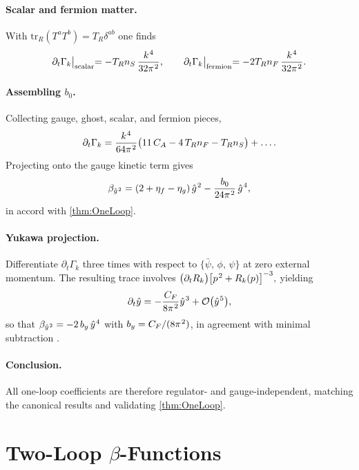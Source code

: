 \documentclass[pdflatex,sn-mathphys-num]{sn-jnl}
\theoremstyle{thmstyleone}
\theoremstyle{thmstyletwo}%
\theoremstyle{thmstylethree}%
\newcommand{\sm}{\hspace{.065em}}
\newcommand{\smexp}[1]{^{\sm #1}}
\begin{document}
\paragraph{Scalar and fermion matter.}
With  
\(
  \mathrm{tr}_{R}(T^{a}T^{b})=T_{R}\delta^{ab}
\)
one finds
\[
  \partial_{t}\Gamma_{k}\bigl|_{\text{scalar}}
    =-T_{R}n_{S}\,
      \frac{k\smexp{4}}{32\pi\smexp{2}},
  \qquad
  \partial_{t}\Gamma_{k}\bigl|_{\text{fermion}}
    =-2T_{R}n_{F}\,
      \frac{k\smexp{4}}{32\pi\smexp{2}}.
\]

\paragraph{Assembling \texorpdfstring{$b_{0}$}{b0}.}
Collecting gauge, ghost, scalar, and fermion pieces,
\[
  \partial_{t}\Gamma_{k}
  =\frac{k\smexp{4}}{64\pi\smexp{2}}
    \bigl(
      11\,C_{A}-4\,T_{R}n_{F}-T_{R}n_{S}
    \bigr)+\dots.
\]
Projecting onto the gauge kinetic term gives
\[
  \beta_{\hat g\smexp{2}}
  =(2+\eta_{f}-\eta_{g})\,\hat g\smexp{2}
   -\frac{b_{0}}{24\pi\smexp{2}}\,\hat g\smexp{4},
\]
in accord with \autoref{thm:OneLoop}.

\paragraph{Yukawa projection.}
Differentiate \(\partial_{t}\Gamma_{k}\) three times with respect to
\(\{\bar\psi,\,\phi,\,\psi\}\) at zero external momentum.  
The resulting trace involves  
\(
  \bigl(\partial_{t}R_{k}\bigr)
  \bigl[p\smexp{2}+R_{k}(p)\bigr]^{-3},
\)
yielding  
\[
  \partial_{t}\hat y
  =-\frac{C_{F}}{8\pi\smexp{2}}\hat y\smexp{3}
  +\mathcal O\bigl(\hat y\smexp{5}\bigr),
\]
so that  
\(
  \beta_{\hat y\smexp{2}}=-2\,b_{y}\,\hat y\smexp{4}
\)
with \(b_{y}=C_{F}/(8\pi\smexp{2})\), in agreement with minimal subtraction
\cite{Gross:1973id,Politzer:1973fx}.

\paragraph{Conclusion.}
All one-loop coefficients are therefore regulator- and gauge-independent,
matching the canonical results and validating \autoref{thm:OneLoop}.

\section{Two-Loop \texorpdfstring{$\beta$}{Beta}-Functions}\label{app:TwoLoopCalc}
\end{document}
